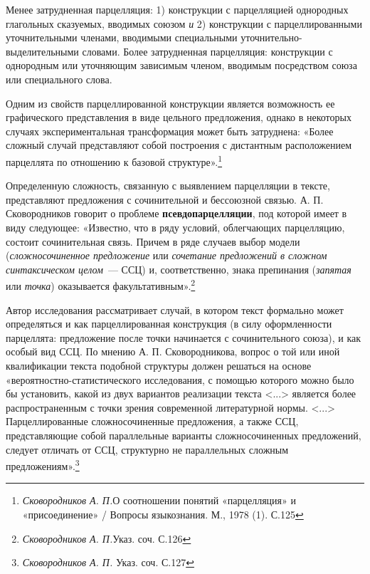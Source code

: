 \documentclass{kursa4}
\begin{document}
{{      Менее затрудненная парцелляция: 1) конструкции с
      парцелляцией однородных глагольных сказуемых, вводимых союзом
      \textit{и }2) конструкции с
      парцеллированными уточнительными членами, вводимыми специальными
      уточнительно-выделительными словами. Более затрудненная парцелляция: конструкции с однородным или уточняющим зависимым
      членом, вводимым посредством союза или специального слова.

      Одним из свойств парцеллированной конструкции является возможность ее графического представления в виде цельного
      предложения, однако в некоторых случаях экспериментальная трансформация
      может быть затруднена: «Более сложный случай представляют собой построения с дистантным расположением парцеллята по отношению к базовой структуре».\footnote{\textit{{ Сковородников А. П.}}{О соотношении понятий «парцелляция» и «присоединение» / Вопросы языкознания. М., 1978 (1). С.125}}

      Определенную сложность, связанную с выявлением парцелляции в тексте, представляют
      предложения с сочинительной и бессоюзной связью. А. П. Сковородников
      говорит о проблеме \textbf{псевдопарцелляции}, под которой имеет в виду следующее: «Известно, что в ряду условий, облегчающих парцелляцию, состоит сочинительная связь. Причем в ряде случаев выбор модели (\textit{сложносочиненное предложение} или \textit{сочетание предложений в сложном синтаксическом целом}{~--- ССЦ) и, соответственно, знака препинания (}\textit{запятая} или \textit{точка}) оказывается факультативным».\footnote{\textit{Сковородников А. П.}{Указ. соч. С.126}}

      Автор исследования рассматривает случай, в котором текст формально может определяться и как парцеллированная конструкция (в силу оформленности парцеллята: предложение после точки начинается с сочинительного союза), и как особый вид ССЦ. По мнению А. П.
      Сковородникова, вопрос о той или иной квалификации текста подобной
      структуры должен решаться на основе «вероятностно-статистического
      исследования, с помощью которого можно было бы установить, какой из
      двух вариантов реализации текста \textless{}...\textgreater{} является
      более распространенным с точки зрения современной литературной нормы.
      \textless{}...\textgreater{} Парцеллированные сложносочиненные
      предложения, а также ССЦ, представляющие собой параллельные варианты
      сложносочиненных предложений, следует отличать от
      {ССЦ, структурно не параллельных сложным
      предложениям}{».}\footnote{\textit{{
      Сковородников А. П. }}{Указ. соч.
      С.127}}{ }

}}
\end{document}
